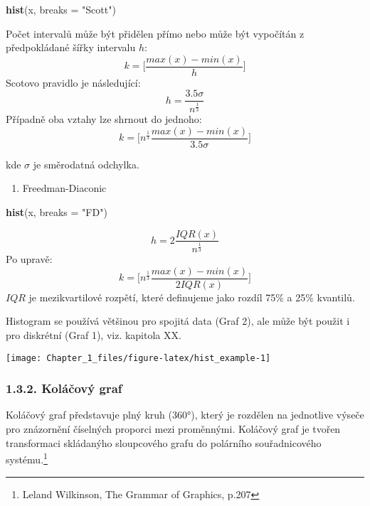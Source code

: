 \documentclass[]{article}
\newenvironment{Shaded}{\begin{snugshade}}{\end{snugshade}}
\newcommand{\KeywordTok}[1]{\textcolor[rgb]{0.13,0.29,0.53}{\textbf{#1}}}
\newcommand{\DataTypeTok}[1]{\textcolor[rgb]{0.13,0.29,0.53}{#1}}
\newcommand{\StringTok}[1]{\textcolor[rgb]{0.31,0.60,0.02}{#1}}
\newcommand{\NormalTok}[1]{#1}
\providecommand{\tightlist}{%
  \setlength{\itemsep}{0pt}\setlength{\parskip}{0pt}}
\let\rmarkdownfootnote\footnote%
\def\footnote{\protect\rmarkdownfootnote}
\theoremstyle{definition}
\theoremstyle{definition}
\theoremstyle{remark}
\begin{document}
\begin{Shaded}
\begin{Highlighting}[]
\KeywordTok{hist}\NormalTok{(x, }\DataTypeTok{breaks =} \StringTok{"Scott"}\NormalTok{)}
\end{Highlighting}
\end{Shaded}

Počet intervalů může být přidělen přímo nebo může být vypočítán z
předpokládané šířky intervalu \(h\):
\[k=\Big[\frac{max(x)-min(x)}{h}\Big]\] Scotovo pravidlo je následující:
\[h=\frac{3.5\sigma}{n^{\frac{1}{3}}}\] Případně oba vztahy lze shrnout
do jednoho:
\[k = \Big[n^{\frac{1}{3}}{\frac{max(x)-min(x)}{3.5\sigma}}\Big]\]

kde \(\sigma\) je směrodatná odchylka.

\begin{enumerate}
\def\labelenumi{\arabic{enumi}.}
\setcounter{enumi}{2}
\tightlist
\item
  Freedman-Diaconic
\end{enumerate}

\begin{Shaded}
\begin{Highlighting}[]
\KeywordTok{hist}\NormalTok{(x, }\DataTypeTok{breaks =} \StringTok{"FD"}\NormalTok{)}
\end{Highlighting}
\end{Shaded}

\[h=2\frac{IQR(x)}{n^{\frac{1}{3}}}\] Po upravě:
\[k = \Big[n^{\frac{1}{3}}{\frac{max(x)-min(x)}{2IQR(x)}}\Big]\] \(IQR\)
je mezikvartilové rozpětí, které definujeme jako rozdíl 75\% a 25\%
kvantilů.

Histogram se používá většinou pro spojitá data (Graf 2), ale může být
použit i pro diskrétní (Graf 1), viz. kapitola XX.

\begin{center}\texttt{[image: Chapter\_1\_files/figure-latex/hist\_example-1]} \end{center}

\subsubsection{1.3.2. Koláčový graf}\label{kolacovy-graf}

Koláčový graf představuje plný kruh (360°), který je rozdělen na
jednotlive výseče pro znázornění číselných proporci mezi proměnnými.
Koláčový graf je tvořen transformaci skládanýho sloupcového grafu do
polárního souřadnicového systému.\footnote{Leland Wilkinson, The Grammar
  of Graphics, p.207}
\end{document}

